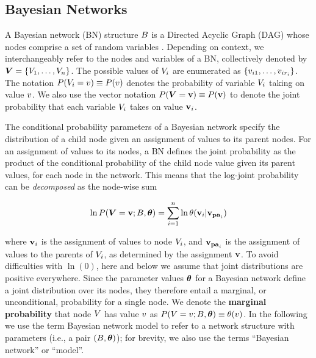 {{\subsection{Bayesian Networks}

A Bayesian network (BN) structure $B$ is a Directed Acyclic Graph (DAG)  whose nodes comprise a set of random variables \citep{Pearl1988}. Depending on context, we interchangeably refer to the nodes  and variables of a BN, collectively denoted by $\boldsymbol{V} = \{V_{1},\ldots,V_{n}\}$. 
The possible values of $V_{i}$ are enumerated as $\{v_{i1},\ldots,v_{ir_{i}}\}$. The notation $P(V_{i} = v)\equiv P(v)$ denotes the probability of variable $V_{i}$ taking on value $v$. We also use the vector notation $P(\boldsymbol{V} = \mathbf{v}) \equiv P(\mathbf{v})$ to denote the joint probability that each variable $V_{i}$ takes on value $\mathbf{v}_{i}$. 


The conditional probability parameters of a Bayesian network specify the distribution of a child node given an assignment of values to its parent nodes. For an assignment of values to its nodes, a BN defines the joint probability as the product of the conditional probability of the child node value given its parent values, for each node in the network. This means that the log-joint probability can be {\em decomposed} as the node-wise sum

\begin{equation} \label{eq:bn}
\ln P(\boldsymbol{V} = \mathbf{v};B,\boldsymbol{\theta}) = \sum_{i=1}^{n} \ln \theta(\mathbf{v}_{i}|\mathbf{v}_{\mathbf{pa}_{i}})
\end{equation}

\noindent where $\mathbf{v}_{i}$ is the assignment of values to node $V_{i}$, and $\mathbf{v}_{\mathbf{pa}_{i}}$  is the assignment of values to the parents of $V_{i}$, as determined by the assignment $\mathbf{v}$. 
To avoid difficulties with $\ln(0)$, here and below we assume that joint distributions are positive everywhere. Since the parameter values $\boldsymbol{\theta}$ for a Bayesian network define a joint distribution over its nodes, they therefore entail a marginal, or unconditional, probability for a single node. We denote the \textbf{marginal probability} that node $V$ has value $v$ as $P(V = v;B,\boldsymbol{\theta}) \equiv \theta(v)$. In the following we use the term Bayesian network model to refer to a network structure with parameters (i.e., a pair $(B,\boldsymbol{\theta})$); for brevity, we also use the terms ``Bayesian network'' or ``model''. 

}}
